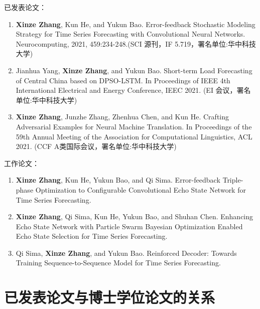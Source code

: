 \begin{publications}

    已发表论文：
    \renewcommand{\labelenumi}{[\arabic{enumi}]}
    \begin{enumerate}
        \item {
            \textbf{Xinze Zhang}, Kun He, and Yukun Bao. Error-feedback Stochastic Modeling Strategy for Time Series Forecasting with Convolutional Neural Networks. Neurocomputing, 2021, 459:234-248.(SCI 源刊，IF 5.719，署名单位:华中科技大学)
              }
        \item {Jianhua Yang, \textbf{Xinze Zhang}, and Yukun Bao. Short-term Load Forecasting of Central China based on DPSO-LSTM. In Proceedings of IEEE 4th International Electrical and Energy Conference, IEEC 2021. (EI 会议，署名单位:华中科技大学)
              }
        \item {\textbf{Xinze Zhang}, Junzhe Zhang, Zhenhua Chen, and Kun He. Crafting Adversarial Examples for Neural Machine Translation. In Proceedings of the 59th Annual Meeting of the Association for Computational Linguistics, ACL 2021. (CCF A类国际会议，署名单位:华中科技大学)}
    \end{enumerate}

    \vspace{1em}
    工作论文：
    \begin{enumerate}
        \item {
            \textbf{Xinze Zhang}, Kun He, Yukun Bao, and Qi Sima. Error-feedback Triple-phase Optimization to Configurable Convolutional Echo State Network for Time Series Forecasting.
              }
        \item {
            \textbf{Xinze Zhang}, Qi Sima, Kun He, Yukun Bao, and Shuhan Chen. Enhancing Echo State Network with Particle Swarm Bayesian Optimization Enabled Echo State Selection for Time Series Forecasting.
              }
        \item {
             Qi Sima, \textbf{Xinze Zhang}, and Yukun Bao. Reinforced Decoder: Towards Training Sequence-to-Sequence Model for Time Series Forecasting.
              }
    \end{enumerate}

\end{publications}



\chapter{已发表论文与博士学位论文的关系}

